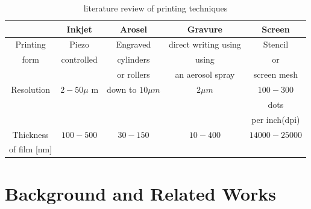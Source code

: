 \begin{table}[h]
\centering
\caption{literature review of printing techniques }
\begin{tabular}{|c|c|c|c|c|}
\hline
& Inkjet & Arosel & Gravure & Screen \\
\hline
Printing  & Piezo & Engraved  & direct
writing using & Stencil  \\

form&controlled&cylinders& using&or\\

&& or rollers&  an aerosol spray &  screen mesh\\
\hline


Resolution &$ 2-50  \mu$ m & down to $10  \mu m $ & $2 \mu m$  & $100-300$  \\ 
&&&& dots  \\ 
&&&&per inch(dpi)   \\ 
\hline
Thickness & $100-500$ & $30-150$ & $10-400$ &$ 14000-25000$  \\
of film [nm] &&&&\\

\hline
\end{tabular}
\label{tab:1}
\end{table}


\section{Background and Related Works}
\label{Background and Related Works} 

